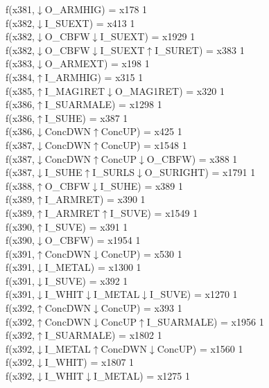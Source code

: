 f(x381,$\downarrow$O\_ARMHIG) = x178 {1} \\
f(x382,$\downarrow$I\_SUEXT) = x413 {1} \\
f(x382,$\downarrow$O\_CBFW$\downarrow$I\_SUEXT) = x1929 {1} \\
f(x382,$\downarrow$O\_CBFW$\downarrow$I\_SUEXT$\uparrow$I\_SURET) = x383 {1} \\
f(x383,$\downarrow$O\_ARMEXT) = x198 {1} \\
f(x384,$\uparrow$I\_ARMHIG) = x315 {1} \\
f(x385,$\uparrow$I\_MAG1RET$\downarrow$O\_MAG1RET) = x320 {1} \\
f(x386,$\uparrow$I\_SUARMALE) = x1298 {1} \\
f(x386,$\uparrow$I\_SUHE) = x387 {1} \\
f(x386,$\downarrow$ConcDWN$\uparrow$ConcUP) = x425 {1} \\
f(x387,$\downarrow$ConcDWN$\uparrow$ConcUP) = x1548 {1} \\
f(x387,$\downarrow$ConcDWN$\uparrow$ConcUP$\downarrow$O\_CBFW) = x388 {1} \\
f(x387,$\downarrow$I\_SUHE$\uparrow$I\_SURLS$\downarrow$O\_SURIGHT) = x1791 {1} \\
f(x388,$\uparrow$O\_CBFW$\downarrow$I\_SUHE) = x389 {1} \\
f(x389,$\uparrow$I\_ARMRET) = x390 {1} \\
f(x389,$\uparrow$I\_ARMRET$\uparrow$I\_SUVE) = x1549 {1} \\
f(x390,$\uparrow$I\_SUVE) = x391 {1} \\
f(x390,$\downarrow$O\_CBFW) = x1954 {1} \\
f(x391,$\uparrow$ConcDWN$\downarrow$ConcUP) = x530 {1} \\
f(x391,$\downarrow$I\_METAL) = x1300 {1} \\
f(x391,$\downarrow$I\_SUVE) = x392 {1} \\
f(x391,$\downarrow$I\_WHIT$\downarrow$I\_METAL$\downarrow$I\_SUVE) = x1270 {1} \\
f(x392,$\uparrow$ConcDWN$\downarrow$ConcUP) = x393 {1} \\
f(x392,$\uparrow$ConcDWN$\downarrow$ConcUP$\uparrow$I\_SUARMALE) = x1956 {1} \\
f(x392,$\uparrow$I\_SUARMALE) = x1802 {1} \\
f(x392,$\downarrow$I\_METAL$\uparrow$ConcDWN$\downarrow$ConcUP) = x1560 {1} \\
f(x392,$\downarrow$I\_WHIT) = x1807 {1} \\
f(x392,$\downarrow$I\_WHIT$\downarrow$I\_METAL) = x1275 {1} \\
